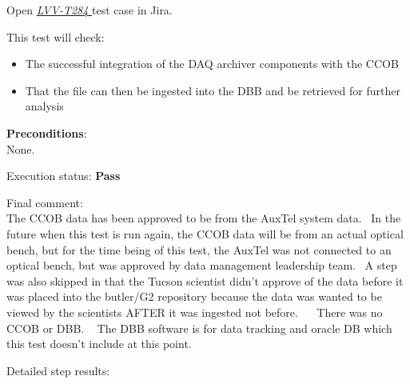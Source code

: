 \documentclass[DM,STR,toc]{lsstdoc}
\providecommand{\tightlist}{
  \setlength{\itemsep}{0pt}\setlength{\parskip}{0pt}}
\begin{document}
Open  \href{https://jira.lsstcorp.org/secure/Tests.jspa#/testCase/LVV-T284}{\textit{ LVV-T284 } }
test case in Jira.

    This test will check:

\begin{itemize}
\tightlist
\item
  The successful integration of the DAQ archiver components with the
  CCOB
\item
  That the file can then be ingested into the DBB and be retrieved for
  further analysis
\end{itemize}


    \textbf{ Preconditions}:\\
    None.


    Execution status: {\bf Pass }

    Final comment:\\The CCOB data has been approved to be from the AuxTel system data. ~In
the future when this test is run again, the CCOB data will be from an
actual optical bench, but for the time being of this test, the AuxTel
was not connected to an optical bench, but was approved by data
management leadership team. ~A step was also skipped in that the Tucson
scientist didn't approve of the data before it was placed into the
butler/G2 repository because the data was wanted to be viewed by the
scientists AFTER it was ingested not before. ~ ~There was no CCOB or
DBB. ~ The DBB software is for data tracking and oracle DB which this
test doesn't include at this point.~~



    Detailed step results:
\end{document}
